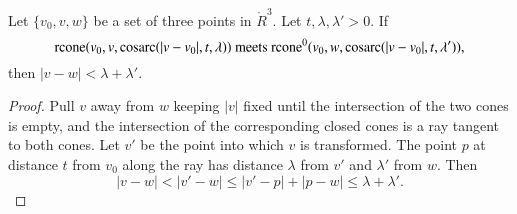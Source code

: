 \begin{tarskidata}
\begin{tarski}
\begin{lemma}
Let $\{v_0,v,w\}$ be a set of three points in $\ring{R}^3$.  Let $t,\lambda,\lambda'>0$.  If 
$${\operatorname{rcone}}(v_0,v,\operatorname{cosarc}(|v-v_0|,t,\lambda)) \text{ meets }
{\operatorname{rcone}}^0(v_0,w,\operatorname{cosarc}(|v-v_0|,t,\lambda')),$$ then
$|v-w| < \lambda+\lambda'$.
\end{lemma}

\begin{proof} Pull $v$ away from $w$ keeping $|v|$ fixed
until the intersection of the two
cones is empty, and the intersection of the corresponding closed cones
is a ray tangent to both cones.  Let $v'$ be the point into which
$v$ is transformed.  The point $p$ at distance $t$ from $v_0$ along
the ray has distance $\lambda$ from $v'$ and $\lambda'$ from $w$.
Then
  $$
  |v-w| < |v'-w| \le |v'-p| + |p-w| \le \lambda + \lambda'.
  $$
\end{proof}
\end{tarski}
\end{tarskidata}



\filetarskiaway